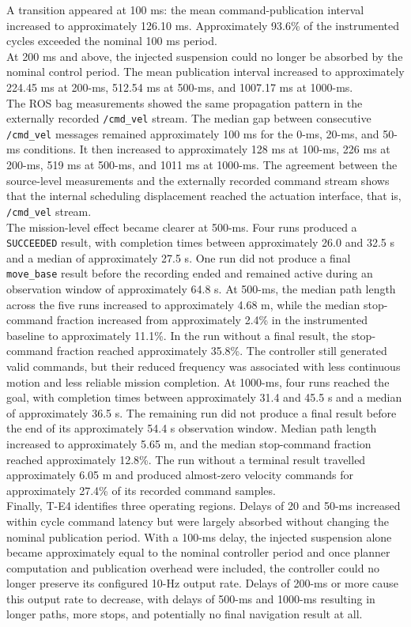 \noindent A transition appeared at 100 ms: the mean command-publication interval increased to approximately 126.10 ms. Approximately 93.6\% of the instrumented cycles exceeded the nominal 100 ms period.
\\
At 200 ms and above, the injected suspension could no longer be absorbed by the nominal control period. The mean publication interval increased to approximately 224.45 ms at 200-ms, 512.54 ms at 500-ms, and 1007.17 ms at 1000-ms.
\\
The ROS bag measurements showed the same propagation pattern in the externally recorded \texttt{/cmd\_vel} stream. The median gap between consecutive \texttt{/cmd\_vel} messages remained approximately 100 ms for the 0-ms, 20-ms, and 50-ms conditions. It then increased to approximately 128 ms at 100-ms, 226 ms at 200-ms, 519 ms at 500-ms, and 1011 ms at 1000-ms. The agreement between the source-level measurements and the externally recorded command stream shows that the internal scheduling displacement reached the actuation interface, that is, \texttt{/cmd\_vel} stream.
\\
The mission-level effect became clearer at 500-ms. Four runs produced a \texttt{SUCCEEDED} result, with completion times between approximately 26.0 and 32.5 s and a median of approximately 27.5 s. One run did not produce a final \texttt{move\_base} result before the recording ended and remained active during an observation window of approximately 64.8 s.
At 500-ms, the median path length across the five runs increased to approximately 4.68 m, while the median stop-command fraction increased from approximately 2.4\% in the instrumented baseline to approximately 11.1\%. In the run without a final result, the stop-command fraction reached approximately 35.8\%. The controller still generated valid commands, but their reduced frequency was associated with less continuous motion and less reliable mission completion.
At 1000-ms, four runs reached the goal, with completion times between approximately 31.4 and 45.5 s and a median of approximately 36.5 s. The remaining run did not produce a final result before the end of its approximately 54.4 s observation window. Median path length increased to approximately 5.65 m, and the median stop-command fraction reached approximately 12.8\%. The run without a terminal result travelled approximately 6.05 m and produced almost-zero velocity commands for approximately 27.4\% of its recorded command samples.
\\
Finally, T-E4 identifies three operating regions. Delays of 20 and 50-ms increased within cycle command latency but were largely absorbed without changing the nominal publication period. With a 100-ms delay, the injected suspension alone became approximately equal to the nominal controller period and once planner computation and publication overhead were included, the controller could no longer preserve its configured 10-Hz output rate. Delays of 200-ms or more cause this output rate to decrease, with delays of 500-ms and 1000-ms resulting in longer paths, more stops, and potentially no final navigation result at all.

